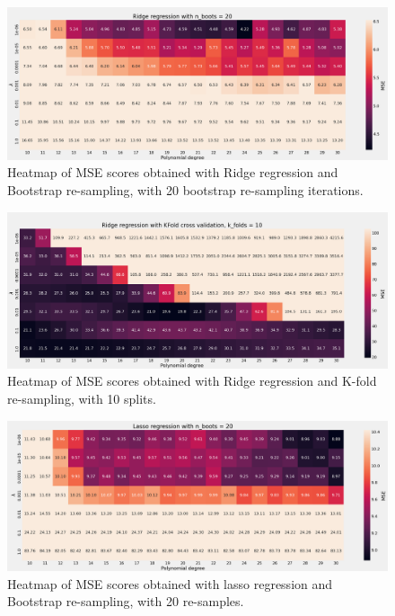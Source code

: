 \begin{figure}[H]
    \centering
    \includegraphics[width=\textwidth]{Figures/g_ridge_heatmap_boots_n_20.png}
    \caption{Heatmap of MSE scores obtained with Ridge regression and Bootstrap
    re-sampling, with 20 bootstrap re-sampling iterations.}  
    \label{fig:g_ridge_boost_heatmap}  
\end{figure}

\begin{figure}[H]
    \centering
    \includegraphics[width=\textwidth]{Figures/g_ridge_heatmap_kfold_n_10.png}
    \caption{Heatmap of MSE scores obtained with Ridge regression and K-fold
    re-sampling, with 10 splits.}  
    \label{fig:g_ridge_kfold_heatmap}  
\end{figure}

\begin{figure}[H]
    \centering
    \includegraphics[width=\textwidth]{Figures/g_lasso_heatmap_boost_n_20.png}
    \caption{Heatmap of MSE scores obtained with lasso regression and Bootstrap
    re-sampling, with 20 re-samples.}  
    \label{fig:g_lasso_boots_heatmap}  
\end{figure}


